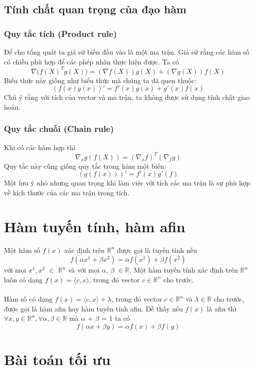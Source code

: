 \documentclass[12pt,a4paper]{report}
\begin{document}
	\subsection{Tính chất quan trọng của đạo hàm}
	\subsubsection{Quy tắc tích (Product rule)} Để cho tổng quát ta giả sử biến đầu vào là một ma trận. Giả sử rằng các hàm số có chiều phù hợp để các phép nhân thực hiện được. Ta có \begin{equation}
		\nabla\big(f(X)^Tg(X)\big) = (\nabla f(X))g(X) + (\nabla g(X))f(X)
	\end{equation} Biểu thức này giống như biểu thức mà chúng ta đã quen thuộc: $$(f(x)g(x))' = f'(x)g(x) + g'(x)f(x)$$ Chú ý rằng với tích của vector và ma trận, ta không được sử dụng tính chất giao hoán.\subsubsection{Quy tắc chuỗi (Chain rule)}
	Khi có các hàm hợp thì \begin{equation}
		\nabla_xg(f(X)) = (\nabla_xf)^T(\nabla_fg)
	\end{equation} Quy tắc này cũng giống quy tắc trong hàm một biến: $$(g(f(x)))' = f'(x)g'(f)$$ Một lưu ý nhỏ nhưng quan trọng khi làm việc với tích các ma trận là sự phù hợp về kích thước của các ma trận trong tích.
	
	\section{Hàm tuyến tính, hàm afin}
	Một hàm số $f(x)$ xác định trên $\mathbb{R}^n$ được gọi là tuyến tính nếu $$f(\alpha x^1 + \beta x^2) = \alpha f(x^1) + \beta f(x^2)$$ với mọi $x^1, x^2$ $\in$ $\mathbb{R}^n$ và với mọi $\alpha$, $\beta$ $\in \mathbb{R}$. Một hàm tuyến tính xác định trên $\mathbb{R}^n$ luôn có dạng $f(x) = \langle c, x \rangle$, trong đó vector $c \in \mathbb{R}^n$ cho trước. \\\\
	Hàm số có dạng $f(x) = \langle c, x \rangle + \lambda$, trong đó vector $c \in \mathbb{R}^n$ và $\lambda \in \mathbb{R}$ cho trước, được gọi là hàm afin hay hàm tuyến tính afin. Dễ thấy nếu $f(x)$ là afin thì $\forall x, y \in \mathbb{R}^n, \forall \alpha, \beta \in \mathbb{R}$ mà  $\alpha$ + $\beta$ = 1 ta có $$f(\alpha x + \beta y) = \alpha f(x) + \beta f(y)$$
	
	\section{Bài toán tối ưu}
\end{document}
